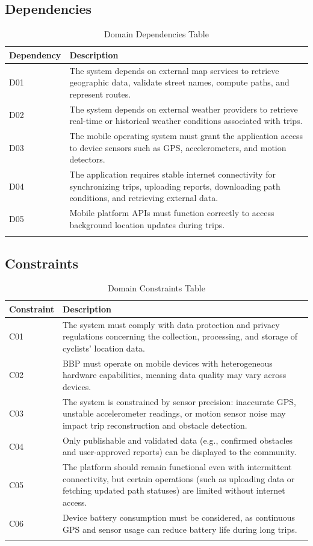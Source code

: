 \subsection{Dependencies}
\label{sub:dependencies}

\begin{longtable}{|l|p{}|}
\hline
\textbf{Dependency} & \textbf{Description} \\
\hline
D01 & The system depends on external map services to retrieve geographic data, validate street names, compute paths, and represent routes. \\
\hline
D02 & The system depends on external weather providers to retrieve real-time or historical weather conditions associated with trips. \\
\hline
D03 & The mobile operating system must grant the application access to device sensors such as GPS, accelerometers, and motion detectors. \\
\hline
D04 & The application requires stable internet connectivity for synchronizing trips, uploading reports, downloading path conditions, and retrieving external data. \\
\hline
D05 & Mobile platform APIs must function correctly to access background location updates during trips. \\
\hline
\caption{Domain Dependencies Table}
\label{tab:domain_dependencies}
\end{longtable}

\subsection{Constraints}
\label{sub:constraints}

\begin{longtable}{|l|p{}|}
\hline
\textbf{Constraint} & \textbf{Description} \\
\hline
C01 & The system must comply with data protection and privacy regulations concerning the collection, processing, and storage of cyclists' location data. \\
\hline
C02 & BBP must operate on mobile devices with heterogeneous hardware capabilities, meaning data quality may vary across devices. \\
\hline
C03 & The system is constrained by sensor precision: inaccurate GPS, unstable accelerometer readings, or motion sensor noise may impact trip reconstruction and obstacle detection. \\
\hline
C04 & Only publishable and validated data (e.g., confirmed obstacles and user-approved reports) can be displayed to the community. \\
\hline
C05 & The platform should remain functional even with intermittent connectivity, but certain operations (such as uploading data or fetching updated path statuses) are limited without internet access. \\
\hline
C06 & Device battery consumption must be considered, as continuous GPS and sensor usage can reduce battery life during long trips. \\
\hline
\caption{Domain Constraints Table}
\label{tab:domain_constraints}
\end{longtable}